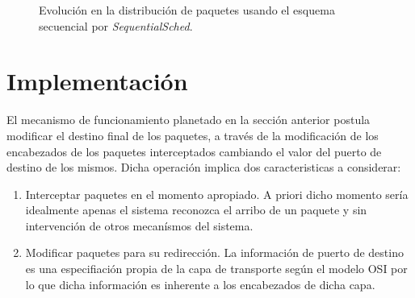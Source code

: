 \begin{figure}[th!]
\centering
{}
\caption{Evolución en la distribución de paquetes usando el esquema secuencial por \emph{SequentialSched}.}
\label{fig:SequentialSched}
\end{figure}

\section{Implementación}
El mecanismo de funcionamiento planetado en la sección anterior postula modificar el destino final de los paquetes, a través de la modificación de los encabezados de los paquetes interceptados cambiando el valor del puerto de destino de los mismos. Dicha operación implica dos caracteristicas a considerar:

\begin{enumerate}
\item Interceptar paquetes en el momento apropiado. A priori dicho momento sería idealmente apenas el sistema reconozca el arribo de un paquete y sin intervención de otros mecanísmos del sistema.
\item Modificar paquetes para su redirección. La información de puerto de destino es una especifiación propia de la capa de transporte según el modelo OSI por lo que dicha información es inherente a los encabezados de dicha capa.
\end{enumerate}

